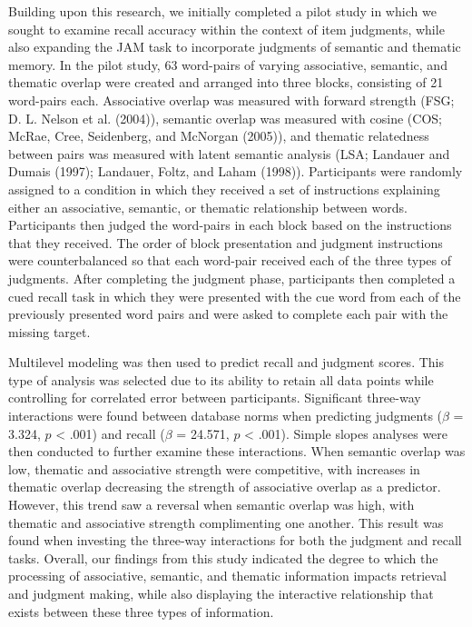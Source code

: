 \documentclass[english,man]{apa6}
\theoremstyle{definition}
\theoremstyle{definition}
\theoremstyle{remark}
\begin{document}
Building upon this research, we initially completed a pilot study in
which we sought to examine recall accuracy within the context of item
judgments, while also expanding the JAM task to incorporate judgments of
semantic and thematic memory. In the pilot study, 63 word-pairs of
varying associative, semantic, and thematic overlap were created and
arranged into three blocks, consisting of 21 word-pairs each.
Associative overlap was measured with forward strength (FSG; D. L.
Nelson et al. (2004)), semantic overlap was measured with cosine (COS;
McRae, Cree, Seidenberg, and McNorgan (2005)), and thematic relatedness
between pairs was measured with latent semantic analysis (LSA; Landauer
and Dumais (1997); Landauer, Foltz, and Laham (1998)). Participants were
randomly assigned to a condition in which they received a set of
instructions explaining either an associative, semantic, or thematic
relationship between words. Participants then judged the word-pairs in
each block based on the instructions that they received. The order of
block presentation and judgment instructions were counterbalanced so
that each word-pair received each of the three types of judgments. After
completing the judgment phase, participants then completed a cued recall
task in which they were presented with the cue word from each of the
previously presented word pairs and were asked to complete each pair
with the missing target.

Multilevel modeling was then used to predict recall and judgment scores.
This type of analysis was selected due to its ability to retain all data
points while controlling for correlated error between participants.
Significant three-way interactions were found between database norms
when predicting judgments (\(\beta\) = 3.324, \(p\) \textless{} .001)
and recall (\(\beta\) = 24.571, \(p\) \textless{} .001). Simple slopes
analyses were then conducted to further examine these interactions. When
semantic overlap was low, thematic and associative strength were
competitive, with increases in thematic overlap decreasing the strength
of associative overlap as a predictor. However, this trend saw a
reversal when semantic overlap was high, with thematic and associative
strength complimenting one another. This result was found when investing
the three-way interactions for both the judgment and recall tasks.
Overall, our findings from this study indicated the degree to which the
processing of associative, semantic, and thematic information impacts
retrieval and judgment making, while also displaying the interactive
relationship that exists between these three types of information.
\end{document}
